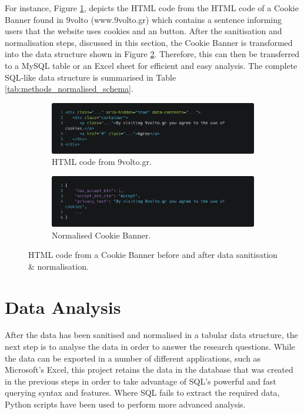 \documentclass[../main.tex]{subfiles}
\begin{document}
For instance, Figure \ref{fig:methods_code}, depicts the HTML code from the HTML code of a Cookie Banner found in 9volto (www.9volto.gr) which contains a sentence informing users that the website uses cookies and an  button. After the sanitisation and normalisation steps, discussed in this section, the Cookie Banner is transformed into the data structure shown in Figure \ref{fig:methods_code_normalised}. Therefore, this can then be transferred to a MySQL table or an Excel sheet for efficient and easy analysis. The complete SQL-like data structure is summarised in Table \ref{tab:methods_normalised_schema}.

\begin{figure}[ht]
    \centering
    \begin{subfigure}[b]{0.49\textwidth}
        \centering
        \includegraphics[width=\textwidth]{images/methodology/code.png}
        \caption{HTML code from 9volto.gr.}
        \label{fig:methods_code}
    \end{subfigure}
    \hfill
    \begin{subfigure}[b]{0.49\textwidth}
        \centering
        \includegraphics[width=\textwidth]{images/methodology/normalised.png}
        \caption{Normalised Cookie Banner.}
        \label{fig:methods_code_normalised}
    \end{subfigure}
    \caption{HTML code from a Cookie Banner before and after data sanitisation \& normalisation.}
    \label{fig:methods_html_code}
\end{figure}


\section{Data Analysis}
\label{sec:methodology_analysing_data}
After the data has been sanitised and normalised in a tabular data structure, the next step is to analyse the data in order to answer the research questions. While the data can be exported in a number of different applications, such as Microsoft’s Excel, this project retains the data in the database that was created in the previous steps in order to take advantage of SQL’s powerful and fast querying syntax and features. Where SQL fails to extract the required data, Python scripts have been used to perform more advanced analysis.
   
\end{document}
